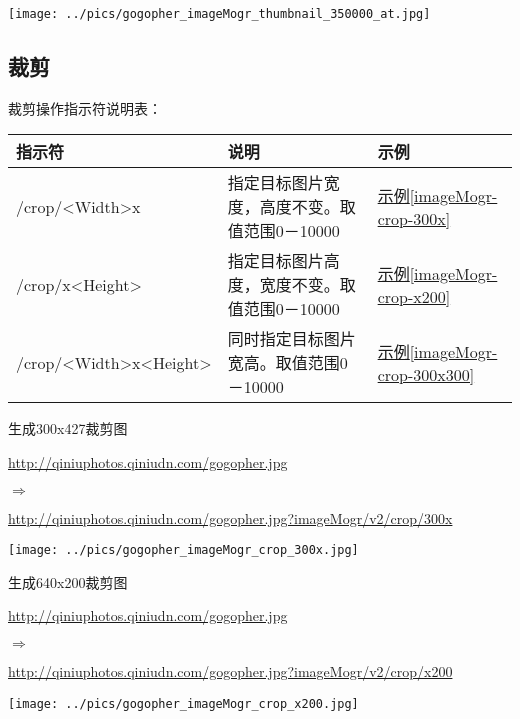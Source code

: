 \documentclass[11pt, oneside]{book}
\newcommand{\qpar}[1]{
\vspace{0.25em}
\noindent
#1\par
\vspace{0.25em}
}
\newcommand{\qurl}[1]{\footnotesize\url{#1}\normalsize}
\newcommand{\qtable}[1]{\footnotesize\vspace{0.5em}#1\vspace{0.5em}\normalsize}
\newcommand{\qsample}[1]{\hyperref[#1]{示例\ref*{#1}}}
\begin{document}
\begin{CJK*}{UTF8}{song}
\begin{sample}
    \begin{center}
      \texttt{[image: ../pics/gogopher\_imageMogr\_thumbnail\_350000\_at.jpg]}
    \end{center}
  \label{imageMogr-thumbnail-350000-at}
\end{sample}

\subsection{裁剪}

\qpar{裁剪操作指示符说明表：}
\qtable{
\label{crop-spec}
\begin{tabular}[t]{|l|p{20em}|p{4em}|}
\hline
指示符 & 说明 & 示例 \\
\hline
/crop/\textless Width\textgreater x & 指定目标图片宽度，高度不变。取值范围0－10000 & \qsample{imageMogr-crop-300x} \\
\hline
/crop/x\textless Height\textgreater & 指定目标图片高度，宽度不变。取值范围0－10000 & \qsample{imageMogr-crop-x200} \\
\hline
/crop/\textless Width\textgreater x\textless Height\textgreater & 同时指定目标图片宽高。取值范围0－10000 & \qsample{imageMogr-crop-300x300} \\
\hline
\end{tabular}
}

\begin{sample}
  \caption{生成300x427裁剪图}
    \qpar{\qurl{http://qiniuphotos.qiniudn.com/gogopher.jpg}}
    \qpar{$\Rightarrow$}
    \qpar{\qurl{http://qiniuphotos.qiniudn.com/gogopher.jpg?imageMogr/v2/crop/300x}}

    \begin{center}
      \texttt{[image: ../pics/gogopher\_imageMogr\_crop\_300x.jpg]}
    \end{center}
  \label{imageMogr-crop-300x}
\end{sample}

\begin{sample}
  \caption{生成640x200裁剪图}
    \qpar{\qurl{http://qiniuphotos.qiniudn.com/gogopher.jpg}}
    \qpar{$\Rightarrow$}
    \qpar{\qurl{http://qiniuphotos.qiniudn.com/gogopher.jpg?imageMogr/v2/crop/x200}}

    \begin{center}
      \texttt{[image: ../pics/gogopher\_imageMogr\_crop\_x200.jpg]}
    \end{center}
  \label{imageMogr-crop-x200}
\end{sample}


\end{CJK*}
\end{document}

